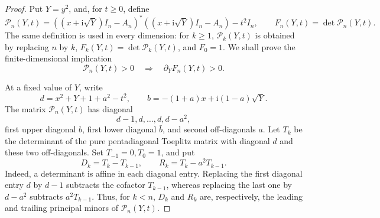 \documentclass[review,hidelinks,onefignum,onetabnum]{siamart251216}
\newcommand{\ii}{\mathrm i}
\begin{document}
\begin{proof}
Put \(Y=y^2\), and, for \(t\geq0\), define
\[
 \mathcal P_n(Y,t)=((x+\ii\sqrt Y)I_n-A_n)^*
 ((x+\ii\sqrt Y)I_n-A_n)-t^2I_n,
 \qquad F_n(Y,t)=\det \mathcal P_n(Y,t).
\]
The same definition is used in every dimension: for \(k\geq1\),
\(\mathcal P_k(Y,t)\) is obtained by replacing \(n\) by \(k\),
\(F_k(Y,t)=\det \mathcal P_k(Y,t)\), and \(F_0=1\).
We shall prove the finite-dimensional implication
\begin{equation}\label{eq:det-derivative-positive}
 \mathcal P_n(Y,t)>0\quad\Longrightarrow\quad
 \partial_YF_n(Y,t)>0.
\end{equation}

At a fixed value of \(Y\), write
\[
 d=x^2+Y+1+a^2-t^2,
 \qquad b=-(1+a)x+\ii(1-a)\sqrt Y.
\]
The matrix \(\mathcal P_n(Y,t)\) has diagonal
\[
 d-1,d,\ldots,d,d-a^2,
\]
first upper diagonal \(b\), first lower diagonal \(\bar b\), and second
off-diagonals \(a\).  Let \(T_k\) be the determinant of the pure
pentadiagonal Toeplitz matrix with diagonal \(d\) and these two
off-diagonals.  Set \(T_{-1}=0,T_0=1\), and put
\begin{equation}\label{eq:D-R-def}
 D_k=T_k-T_{k-1},\qquad R_k=T_k-a^2T_{k-1}.
\end{equation}
Indeed, a determinant is affine in each diagonal entry.  Replacing the
first diagonal entry \(d\) by \(d-1\) subtracts the cofactor
\(T_{k-1}\), whereas replacing the last one by \(d-a^2\) subtracts
\(a^2T_{k-1}\).  Thus, for \(k<n\), \(D_k\) and \(R_k\) are,
respectively, the leading and trailing principal minors of
\(\mathcal P_n(Y,t)\).


\end{proof}
\end{document}
